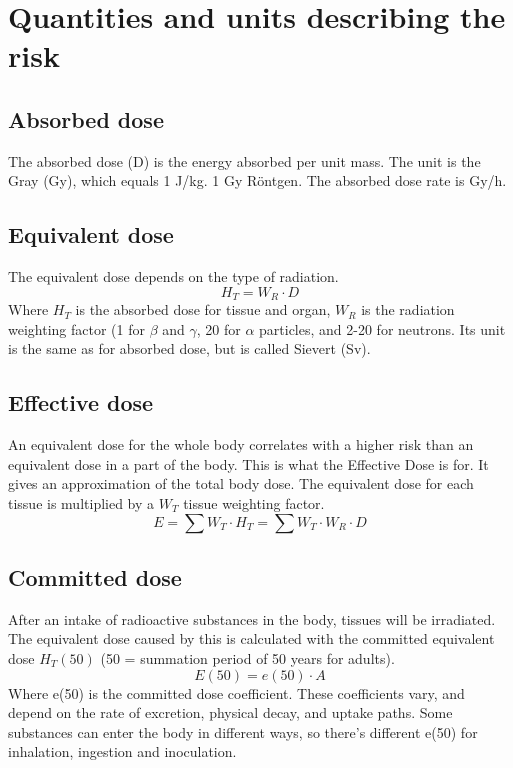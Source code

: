 \section{Quantities and units describing the risk}
\subsection{Absorbed dose}
The absorbed dose (D) is the energy absorbed per unit mass. The unit is the Gray (Gy), which equals 1 J/kg. 1 Gy  Röntgen. The absorbed dose rate is Gy/h.

\subsection{Equivalent dose}
The equivalent dose depends on the type of radiation. 
\[H_T=W_R\cdot D\]
Where $H_T$ is the absorbed dose for tissue and organ, $W_R$ is the radiation weighting factor (1 for $\beta$ and $\gamma$, 20 for $\alpha$ particles, and 2-20 for neutrons. Its unit is the same as for absorbed dose, but is called Sievert (Sv).

\subsection{Effective dose}
An equivalent dose for the whole body correlates with a higher risk than an equivalent dose in a part of the body. This is what the Effective Dose is for. It gives an approximation of the total body dose. The equivalent dose for each tissue is multiplied by a $W_T$ tissue weighting factor.
\[E=\sum W_T \cdot H_T = \sum W_T \cdot W_R \cdot D\]

\subsection{Committed dose}
After an intake of radioactive substances in the body, tissues will be irradiated. The equivalent dose caused by this is calculated with the committed equivalent dose $H_T(50)$ (50 = summation period of 50 years for adults).
\[E(50) = e(50)\cdot A\]
Where e(50) is the committed dose coefficient. These coefficients vary, and depend on the rate of excretion, physical decay, and uptake paths. Some substances can enter the body in different ways, so there's different e(50) for inhalation, ingestion and inoculation.
